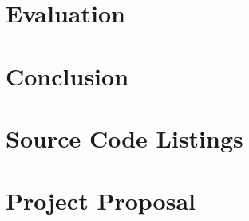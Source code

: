 \documentclass[a4paper,12pt,twoside,openright]{report}
\begin{document}
\chapter{Evaluation}


\chapter{Conclusion}



\printbibliography

\appendix

% 

\chapter{Source Code Listings}


\chapter{Project Proposal}

\end{document}
